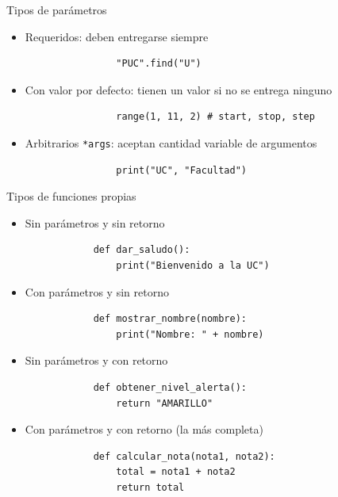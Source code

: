 \documentclass{beamer}
\begin{document}
    \begin{frame}[fragile, t]{Tipos de parámetros}
        \begin{itemize}
            \item Requeridos: deben entregarse siempre
            \begin{verbatim}
                "PUC".find("U")
            \end{verbatim}
            \item Con valor por defecto: tienen un valor si no se entrega ninguno
            \begin{verbatim}
                range(1, 11, 2) # start, stop, step
            \end{verbatim}
            \item Arbitrarios \texttt{*args}: aceptan cantidad variable de argumentos
            \begin{verbatim}
                print("UC", "Facultad")
            \end{verbatim}
        \end{itemize}
    \end{frame}
    
    \begin{frame}[fragile, t]{Tipos de funciones propias}
        \begin{itemize}
            \item Sin parámetros y sin retorno
            \begin{verbatim}
            def dar_saludo():
                print("Bienvenido a la UC")
            \end{verbatim}
            \item Con parámetros y sin retorno
            \begin{verbatim}
            def mostrar_nombre(nombre):
                print("Nombre: " + nombre)
            \end{verbatim}
            \item Sin parámetros y con retorno
            \begin{verbatim}
            def obtener_nivel_alerta():
                return "AMARILLO"
            \end{verbatim}
            \item Con parámetros y con retorno (la más completa)
            \begin{verbatim}
            def calcular_nota(nota1, nota2):
                total = nota1 + nota2
                return total
            \end{verbatim}
        \end{itemize}
    \end{frame}
\end{document}
